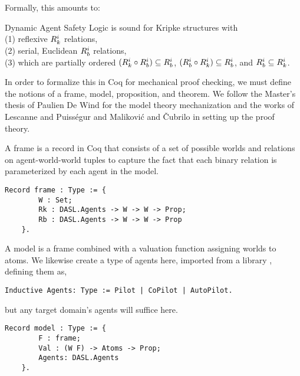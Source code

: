 Formally, this amounts to:

\begin{theorem}[Soundness]
	Dynamic Agent Safety Logic is sound for Kripke structures with\\ (1) reflexive $R_{k}^i$ relations,\\ (2) serial, Euclidean $R_{b}^i$ relations, \\(3) which are partially ordered $(R_{k}^i \circ R_{b}^i) \subseteq R_{b}^i$, $(R_{b}^i \circ R_{k}^i) \subseteq R_{b}^i$, and $R_{b}^i \subseteq R_{k}^i$.
\end{theorem}

In order to formalize this in Coq for mechanical proof checking, we must define the notions of a frame, model, proposition, and theorem. We follow the Master's thesis of Paulien De Wind \cite{dewind} for the model theory mechanization and the works of Lescanne and Puiss\'egur \cite{lescanne, puislescanne} and Malikovi\'c and \v Cubrilo \cite{delcoq1, delcoq2} in setting up the proof theory.

A frame is a record in Coq that consists of a set of possible worlds and relations on agent-world-world tuples to capture the fact that each binary relation is parameterized by each agent in the model.

\begin{tcolorbox}
	\begin{lstlisting}[language=Coq]
	Record frame : Type := {
		W : Set;
		Rk : DASL.Agents -> W -> W -> Prop;
		Rb : DASL.Agents -> W -> W -> Prop
	}.
	\end{lstlisting}	
	
\end{tcolorbox}

A model is a frame combined with a valuation function assigning worlds to atoms. We likewise create a type of agents here, imported from a library \DASL, defining them as,

\begin{tcolorbox}
	\begin{lstlisting}[language=Coq]
	Inductive Agents: Type := Pilot | CoPilot | AutoPilot.
	\end{lstlisting}	
	
\end{tcolorbox}
 
 but any target domain's agents will suffice here.

\begin{tcolorbox}
	\begin{lstlisting}[language=Coq]
	Record model : Type := {
		F : frame;
		Val : (W F) -> Atoms -> Prop;
		Agents: DASL.Agents
	}.
	\end{lstlisting}	
	
\end{tcolorbox}

